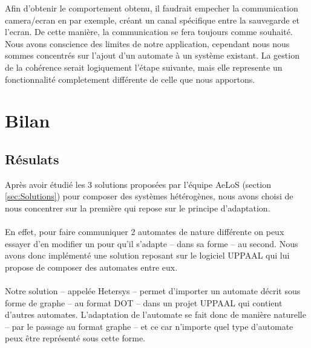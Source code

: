\documentclass[12pt,a4paper]{report}
\begin{document}
    Afin d'obtenir le comportement obtenu, il faudrait empecher la communication camera/ecran en par exemple, créant un canal spécifique entre la sauvegarde et l'ecran. De cette manière, la communication se fera toujours comme souhaité.\\
    
    Nous avons conscience des limites de notre application, cependant nous nous sommes concentrés sur l'ajout d'un automate à un système existant. La gestion de la cohérence serait logiquement l'étape suivante, mais elle represente un fonctionnalité completement différente de celle que nous apportons.

\chapter{Bilan}
\section{Résulats}
Après avoir étudié les 3 solutions proposées par l'équipe AeLoS (section \ref{sec:Solutions}) pour composer des systèmes hétérogènes, 
nous avons choisi de nous concentrer sur la première qui repose sur le principe d'adaptation.
\\\\
En effet, pour faire communiquer 2 automates de nature différente on peux essayer d'en modifier un 
pour qu'il s'adapte -- dans sa forme -- au second. Nous avons donc implémenté une solution reposant sur 
le logiciel UPPAAL qui lui propose de composer des automates entre eux.
\\\\
Notre solution -- appelée Hetersys -- permet d'importer un automate décrit sous forme de graphe -- au format DOT --
dans un projet UPPAAL qui contient d'autres automates. L'adaptation de l'automate se fait donc de manière naturelle
-- par le passage au format graphe -- et ce car n'importe quel type d'automate peux être représenté sous cette forme.
\end{document}
